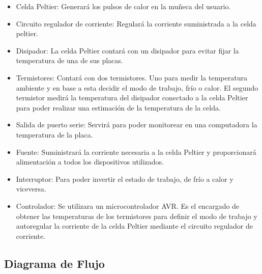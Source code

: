 \documentclass[10pt,spanish,a4paper,openany,notitlepage]{article}
\begin{document}
\begin{itemize}
\item{Celda Peltier:} Generará los pulsos de calor en la muñeca del usuario.
\item{Circuito regulador de corriente:} Regulará la corriente suministrada
a la celda peltier.
\item{Disipador:} La celda Peltier contará con un disipador para evitar
fijar la temperatura de una de sus placas.
\item{Termistores:} Contará con dos termistores. Uno para medir la
temperatura ambiente y en base a esta decidir el modo de trabajo, frío
o calor. El segundo termistor medirá la temperatura del disipador conectado
a la celda Peltier para poder realizar una estimación de la temperatura
de la celda.
\item{Salida de puerto serie:} Servirá para poder monitorear en una 
computadora la temperatura de la placa.
\item{Fuente:} Suministrará la corriente necesaria a la celda Peltier y 
 proporcionará alimentación a todos los dispositivos utilizados.
\item{Interruptor:} Para poder invertir el estado de trabajo, de frío a calor 
y viceversa.
\item{Controlador:} Se utilizara un microcontrolador AVR. Es
el encargado de obtener las temperaturas de los termistores para definir
el modo de trabajo y autoregular la corriente de la celda Peltier mediante
el circuito regulador de corriente.
\end{itemize}

\subsection{Diagrama de Flujo}
\end{document}
